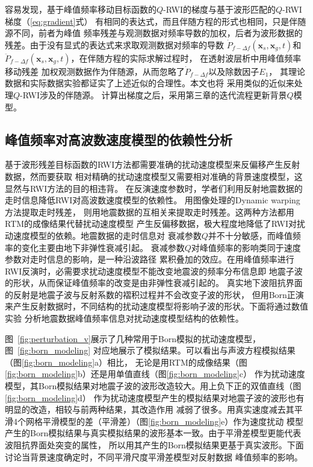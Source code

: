 容易发现，基于峰值频率移动目标函数的$Q$-RWI的梯度与基于波形匹配的$Q$-RWI梯度（\ref{eq:gradient}式）
有相同的表达式，而且伴随方程的形式也相同，只是伴随源不同，前者为峰值
频率残差与观测数据对频率导数的加权，后者为波形数据的残差。由于没有显式的表达式来求取观测数据对频率的导数
$\dot{P}_{f-\Delta f}(\mathbf{x}_s,\mathbf{x}_g,t)$和$\ddot{P}_{f-\Delta f}(\mathbf{x}_s,
\mathbf{x}_g,t)$，在伴随方程的实际求解过程时，
在透射波层析中用峰值频率移动残差
加权观测数据作为伴随源，从而忽略了$\dot{P}_{f-\Delta f}$以及除数因子$E_1$，
其理论数据和实际数据实验都证实了上述近似的合理性。本文也将
采用类似的近似来处理$Q$-RWI涉及的伴随源。
计算出梯度之后，采用第三章的迭代流程更新背景$Q$模型。

\vspace{1.0cm}
\subsection{峰值频率对高波数速度模型的依赖性分析}
\vspace{0.1cm}

基于波形残差目标函数的RWI方法都需要准确的扰动速度模型来反偏移产生反射数据，然而要获取
相对精确的扰动速度模型又需要相对准确的背景速度模型，这显然与RWI方法的目的相违背。
在反演速度参数时，学者们利用反射地震数据的走时信息降低RWI对高波数速度模型的依赖性。
用图像处理的Dynamic warping方法提取走时残差，
则用地震数据的互相关来提取走时残差。这两种方法都用RTM的成像结果代替扰动速度模型
产生反偏移数据，极大程度地降低了RWI对扰动速度模型的依赖。地震数据的走时信息对
衰减参数$Q$并不十分敏感，而峰值频率的变化主要由地下非弹性衰减引起。
衰减参数$Q$对峰值频率的影响类同于速度参数对走时信息的影响，是一种沿波路径
累积叠加的效应。在用峰值频率进行RWI反演时，必需要求扰动速度模型不能改变地震波的频率分布信息即
地震子波的形状，从而保证峰值频率的改变是由非弹性衰减引起的。
真实地下波阻抗界面的反射是地震子波与反射系数的褶积过程并不会改变子波的形状，
但用Born正演来产生反射数据时，不同结构的扰动速度模型将影响子波的形状。下面将通过数值实验
分析地震数据峰值频率信息对扰动速度模型结构的依赖性。

图~\ref{fig:perturbation_v}展示了几种常用于Born模拟的扰动速度模型，图~\ref{fig:born_modeling}
对应地展示了模拟结果。可以看出与声波方程模拟结果（图\ref{fig:born_modeling}a）相比，
无论是用RTM的成像结果（图\ref{fig:born_modeling}b）还是用单值直线（图\ref{fig:born_modeling}c）
作为扰动速度模型，其Born模拟结果对地震子波的波形改造较大。用上负下正的双值直线（图\ref{fig:born_modeling}d）
作为扰动速度模型产生的模拟结果对地震子波的波形也有明显的改造，相较与前两种结果，其改造作用
减弱了很多。用真实速度减去其平滑4个网格平滑模型的差（平滑差）（图\ref{fig:born_modeling}e）作为速度扰动
模型产生的Born模拟结果与真实模拟结果的波形基本一致。由于平滑差模型更能代表波阻抗界面处突变的属性，
所以用其产生的Born模拟结果更基于真实波形。下面讨论当背景速度确定时，不同平滑尺度平滑差模型对反射数据
峰值频率的影响。

